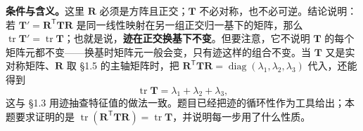 \documentclass[11pt]{ctexart}
\newcommand{\ten}[1]{\mathbf{#1}}
\newcommand{\tr}{\operatorname{tr}}
\begin{document}
\textbf{条件与含义。}这里 $\ten R$ 必须是方阵且正交；$\ten T$ 不必对称，也不必可逆。结论说明：若 $\ten T'=\ten R^{\mathsf T}\ten T\ten R$ 是同一线性映射在另一组正交归一基下的矩阵，那么 $\tr\ten T'=\tr\ten T$；也就是说，\textbf{迹在正交换基下不变}。但要注意，它不说明 $\ten T$ 的每个矩阵元都不变——换基时矩阵元一般会变，只有迹这样的组合不变。当 $\ten T$ 又是实对称矩阵、$\ten R$ 取 §1.5 的主轴矩阵时，把 $\ten R^{\mathsf T}\ten T\ten R=\operatorname{diag}(\lambda_1,\lambda_2,\lambda_3)$ 代入，还能得到
\[
\tr\ten T=\lambda_1+\lambda_2+\lambda_3,
\]
这与 §1.3 用迹抽查特征值的做法一致。题目已经把迹的循环性作为工具给出；本题要求证明的是 $\tr(\ten R^{\mathsf T}\ten T\ten R)=\tr\ten T$，并说明每一步用了什么性质。
\end{document}
